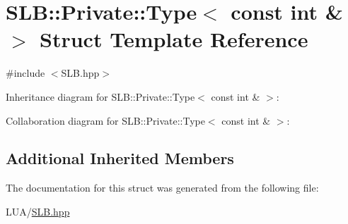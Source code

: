 \hypertarget{structSLB_1_1Private_1_1Type_3_01const_01int_01_6_01_4}{}\section{S\+LB\+:\+:Private\+:\+:Type$<$ const int \& $>$ Struct Template Reference}
\label{structSLB_1_1Private_1_1Type_3_01const_01int_01_6_01_4}


{\ttfamily \#include $<$S\+L\+B.\+hpp$>$}



Inheritance diagram for S\+LB\+:\+:Private\+:\+:Type$<$ const int \& $>$\+:


Collaboration diagram for S\+LB\+:\+:Private\+:\+:Type$<$ const int \& $>$\+:
\subsection*{Additional Inherited Members}


The documentation for this struct was generated from the following file\+:\begin{DoxyCompactItemize}
\item 
L\+U\+A/\hyperlink{SLB_8hpp}{S\+L\+B.\+hpp}\end{DoxyCompactItemize}
